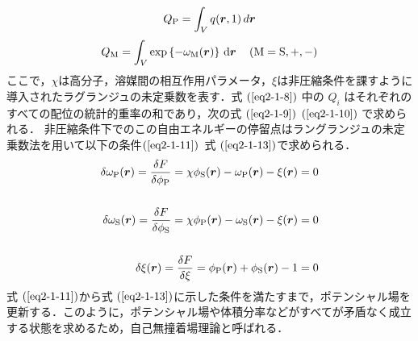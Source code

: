 \documentclass[10.5pt,a4j]{jarticle}
\newcommand{\bvec}[1]{
\mbox{\boldmath $#1$}
}%
\begin{document}
%
\begin{equation}
    \label{eq2-1-9}
    Q_{\rm{P}}= \int_{V}  q( \bvec{r},1 ) \, d{\bvec r}
\end{equation}
\begin{equation}
    \label{eq2-1-10}
    Q_{\rm{M}}= \int_{V}  \rm{exp} \left\{ -\omega_{\rm{M}}( \bvec{r} )\right \} \, d{\bvec r} \,\,\,\,\,\,\,(M=\rm{S}, +, -)
\end{equation}
ここで，$\chi$は高分子，溶媒間の相互作用パラメータ，$\xi$は非圧縮条件を課すように導入されたラグランジュの未定乗数を表す．式 $ (\ref{eq2-1-8}) $ 中の $ Q_i $ はそれぞれのすべての配位の統計的重率の和であり，次の式 $ (\ref{eq2-1-9}) $ $ (\ref{eq2-1-10}) $ で求められる．
非圧縮条件下でのこの自由エネルギーの停留点はラングランジュの未定乗数法を用いて以下の条件$ (\ref{eq2-1-11}) $~式 $ (\ref{eq2-1-13}) $で求められる．
%
%
{
    \begin{eqnarray}
        \label{eq2-1-11}
        \delta\omega_\mathrm{P}(\bvec{r})
        =\frac{\delta F}{\delta\phi_\mathrm{P}}
        =\chi\phi_\mathrm{S}(\bvec{r})-\omega_\mathrm{P}(\bvec{r})-\xi(\bvec{r})=0\\
        \nonumber \\
        \label{eq2-1-12}
        \delta\omega_\mathrm{S}(\bvec{r})
        =\frac{\delta F}{\delta\phi_\mathrm{S}}
        =\chi\phi_\mathrm{P}(\bvec{r})-\omega_\mathrm{S}(\bvec{r})-\xi(\bvec{r})=0\\
         \nonumber \\
        \label{eq2-1-13}
        \delta\xi(\bvec{r})
        =\frac{\delta F}{\delta\xi}
        =\phi_\mathrm{P}(\bvec{r})+\phi_\mathrm{S}(\bvec{r})-1=0
    \end{eqnarray}
}
式 $ (\ref{eq2-1-11}) $から式 $ (\ref{eq2-1-13}) $に示した条件を満たすまで，ポテンシャル場を更新する．このように，ポテンシャル場や体積分率などがすべてが矛盾なく成立する状態を求めるため，自己無撞着場理論と呼ばれる．
%
%
\newpage
\end{document}
